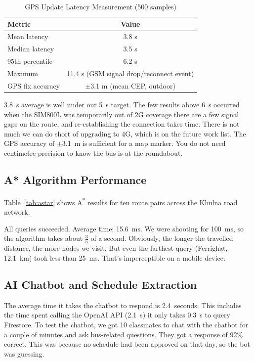 \documentclass[12pt,a4paper]{report}
\begin{document}
\begin{table}[t]
\caption{GPS Update Latency Measurement (500 samples)}
\label{tab:gpslat}
\centering
\begin{tabular}{lc}
\toprule
\textbf{Metric} & \textbf{Value}\\
\midrule
Mean latency          & 3.8 s \\
Median latency        & 3.5 s \\
95th percentile       & 6.2 s \\
Maximum               & 11.4 s (GSM signal drop/reconnect event) \\
GPS fix accuracy      & $\pm$3.1 m (mean CEP, outdoor) \\
\bottomrule
\end{tabular}
\end{table}

3.8~s average is well under our 5~s target. The few results above 6~s occurred when the SIM800L was temporarily out of 2G coverage there are a few signal gaps on the route, and re-establishing the connection takes time. There is not much we can do short of upgrading to 4G, which is on the future work list. The GPS accuracy of $\pm$3.1~m is sufficient for a map marker. You do not need centimetre precision to know the bus is at the roundabout.

\subsection{A* Algorithm Performance}

Table~\ref{tab:astar} shows A\textsuperscript{*} results for ten route pairs across the Khulna road network.

All queries succeeded. Average time: 15.6~ms. We were shooting for 100~ms, so the algorithm takes about $\tfrac{3}{5}$ of a second. Obviously, the longer the travelled distance, the more nodes we visit. But even the farthest query (Ferrighat, 12.1~km) took less than 25~ms. That's imperceptible on a mobile device.

\subsection{AI Chatbot and Schedule Extraction}

The average time it takes the chatbot to respond is 2.4~seconds. This includes the time spent calling the OpenAI API (2.1~s) it only takes 0.3~s to query Firestore. To test the chatbot, we got 10 classmates to chat with the chatbot for a couple of minutes and ask bus-related questions. They got a response of 92\% correct. This was because no schedule had been approved on that day, so the bot was guessing.
\end{document}
